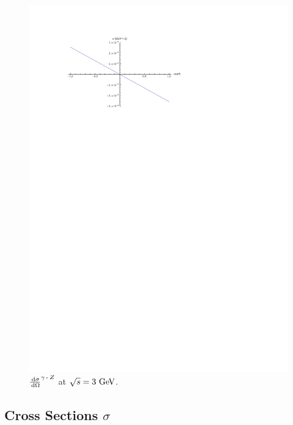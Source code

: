 \documentclass[]{article}
\begin{document}
\begin{figure}[H]
	\vspace{10pt}
	\centering
	\includegraphics[scale=1.4]{diff_gamma_z}
	\caption{$\frac{\,\operatorname{d}\!{\sigma}}{\,\operatorname{d}\!{\Omega}}^{\gamma\operatorname{-}Z }$ at $\sqrt{s}=3\GeV$.}
	\label{fig:diffgammaz}
\end{figure}


\subsection{Cross Sections $\sigma$}
\end{document}
